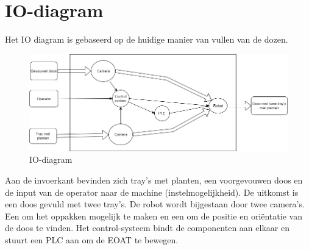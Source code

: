 
\section{IO-diagram}
Het IO diagram is gebaseerd op de huidige manier van vullen van de dozen.  
\newline
\newline
\begin{figure}[h]
	\centering
	\includegraphics[width=\textwidth]{Afbeeldingen/IO-diagram_v2.png}
	\caption{IO-diagram}
\end{figure}

Aan de invoerkant bevinden zich tray's met planten, een voorgevouwen doos en de input van de operator naar de machine (instelmogelijkheid). De uitkomst is een doos gevuld met twee tray's. \newline
De robot wordt bijgestaan door twee camera's. Een om het oppakken mogelijk te maken en een om de positie en oriëntatie van de doos te vinden. Het control-systeem bindt de componenten aan elkaar en stuurt een PLC aan om de EOAT te bewegen.
\newpage
